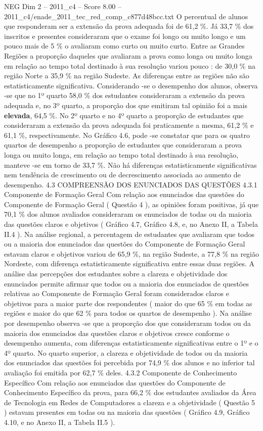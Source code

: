 \begin{textsample}{NEG Dim 2 – 2011\_c4 – Score 8.00 – 2011\_c4/enade\_2011\_tec\_red\_comp\_c877d48bcc.txt}
O percentual de alunos que responderam ser a extensão da prova adequada foi de 61,2 \%.
Já 33,7 \% dos inscritos e presentes consideraram que o exame foi longo ou muito longo e um pouco mais de 5 \% o avaliaram como curto ou muito curto.
Entre as Grandes Regiões a proporção daqueles que avaliaram a prova como longa ou muito longa em relação ao tempo total destinado à sua resolução variou pouco : de 30,0 \% na região Norte a 35,9 \% na região Sudeste.
As diferenças entre as regiões não são estatisticamente significativa.
Considerando -se o desempenho dos alunos, observa -se que no 1º quarto 58,0 \% dos estudantes consideraram a extensão da prova adequada e, no 3º quarto, a proporção dos que emitiram tal opinião foi a mais \textbf{elevada}, 64,5 \%.
No 2º quarto e no 4º quarto a proporção de estudantes que consideraram a extensão da prova adequada foi praticamente a mesma, 61,2 \% e 61,1 \%, respectivamente.
No Gráfico 4.6, pode -se constatar que para os quatro quartos de desempenho a proporção de estudantes que consideraram a prova longa ou muito longa, em relação ao tempo total destinado à sua resolução, manteve -se em torno de 33,7 \%.
Não há diferenças estatisticamente significativas nem tendência de crescimento ou de decrescimento associada ao aumento de desempenho. 4.3 COMPREENSÃO DOS ENUNCIADOS DAS QUESTÕES 4.3.1 Componente de Formação Geral Com relação aos enunciados das questões do Componente de Formação Geral ( Questão 4 ), as opiniões foram positivas, já que 70,1 \% dos alunos avaliados consideraram os enunciados de todas ou da maioria das questões claros e objetivos ( Gráfico 4.7, Gráfico 4.8, e, no Anexo II, a Tabela II.4 ).
Na análise regional, a percentagem de estudantes que avaliaram que todos ou a maioria dos enunciados das questões do Componente de Formação Geral estavam claros e objetivos variou de 65,9 \%, na região Sudeste, a 77,8 \% na região Nordeste, com diferença estatisticamente significativa entre essas duas regiões.
A análise das percepções dos estudantes sobre a clareza e objetividade dos enunciados permite afirmar que todos ou a maioria dos enunciados de questões relativas ao Componente de Formação Geral foram considerados claros e objetivos para a maior parte dos respondentes ( maior do que 65 \% em todas as regiões e maior do que 62 \% para todos os quartos de desempenho ).
Na análise por desempenho observa -se que a proporção dos que consideraram todos ou da maioria dos enunciados das questões claros e objetivos cresce conforme o desempenho aumenta, com diferenças estatisticamente significativas entre o 1º e o 4º quarto.
No quarto superior, a clareza e objetividade de todos ou da maioria dos enunciados das questões foi percebida por 74,9 \% dos alunos e no inferior tal avaliação foi emitida por 62,7 \% deles. 4.3.2 Componente de Conhecimento Específico Com relação aos enunciados das questões do Componente de Conhecimento Específico da prova, para 66,2 \% dos estudantes avaliados da Área de Tecnologia em Redes de Computadores a clareza e a objetividade ( Questão 5 ) estavam presentes em todas ou na maioria das questões ( Gráfico 4.9, Gráfico 4.10, e no Anexo II, a Tabela II.5 ).

\end{textsample}

